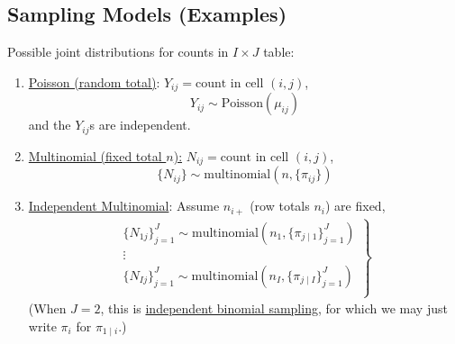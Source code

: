 \documentclass[11pt]{elegantbook}
\begin{document}
\subsection{Sampling Models (Examples)}
Possible joint distributions for counts in $I \times J$ table:
\begin{enumerate}
    \item \underline{Poisson (random total)}: $Y_{ij} =\text{count in cell } (i,j)$,
    $$Y_{ij}\sim \text{Poisson}(\mu_{ij})$$
    and the $Y_{ij}$s are independent.
    \item \underline{Multinomial (fixed total $n$):} $N_{ij} = \text{count in cell } (i,j)$, $$\{N_{ij}\}\sim \text{multinomial}(n,\{\pi_{ij}\})$$
    \item \underline{Independent Multinomial}: Assume $n_{i+}$ (row totals $n_i$) are fixed,
    \begin{equation}
        \begin{aligned}
            \left.\begin{matrix}
                \{N_{1j}\}_{j=1}^J\sim \text{multinomial}(n_1,\{\pi_{j\mid 1}\}_{j=1}^J)\\
                \vdots\\
                \{N_{Ij}\}_{j=1}^J\sim \text{multinomial}(n_I,\{\pi_{j\mid I}\}_{j=1}^J)\\
            \end{matrix}\right\}
        \end{aligned}
        \nonumber
    \end{equation}
    (When $J = 2$, this is \underline{independent binomial sampling}, for which we may just write $\pi_i$ for $\pi_{1\mid i}$.)
\end{enumerate}
\end{document}
